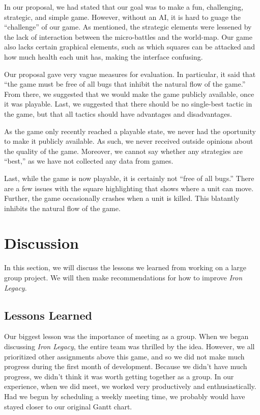 \documentclass{article}
\begin{document}
In our proposal, we had stated that our goal was to make a fun, challenging,
    strategic, and simple game.
    However, without an AI, it is hard to guage the ``challenge'' of our game.
    As mentioned, the strategic elements were lessened by the lack of
    interaction between the micro-battles and the world-map.
    Our game also lacks certain graphical elements, such as which squares
    can be attacked and how much health each unit has, making the interface
    confusing.

Our proposal gave very vague measures for evaluation.
    In particular, it said that ``the game must be free of all bugs that
    inhibit the natural flow of the game.''
    From there, we suggested that we would make the game publicly available,
    once it was playable.
    Last, we suggested that there should be no single-best tactic in the game,
    but that all tactics should have advantages and disadvantages.

As the game only recently reached a playable state,
    we never had the oportunity to make it publicly available.
    As such, we never received outside opinions about the quality of the game.
    Moreover, we cannot say whether any strategies are ``best,''
    as we have not collected any data from games.

Last, while the game is now playable, it is certainly not ``free of all bugs.''
    There are a few issues with the square highlighting that shows
    where a unit can move.
    Further, the game occasionally crashes when a unit is killed.
    This blatantly inhibits the natural flow of the game.

\section*{Discussion}

In this section, we will discuss the lessons we learned from working 
    on a large group project.
    We will then make recommendations for how to improve \emph{Iron Legacy}.

\subsection*{Lessons Learned}

Our biggest lesson was the importance of meeting as a group.
    When we began discussing \emph{Iron Legacy}, the entire team was thrilled
    by the idea.
    However, we all prioritized other assignments above this game,
    and so we did not make much progress during the first month of development.
    Because we didn't have much progress, we didn't think it was worth
    getting together as a group.
    In our experience, when we did meet, we worked very productively
    and enthusiastically.
    Had we begun by scheduling a weekly meeting time,
    we probably would have stayed closer to our original Gantt chart.
\end{document}
